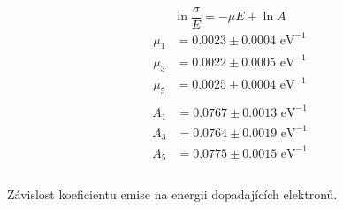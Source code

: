\documentclass[a4paper,11pt]{article}
\begin{document}
\begin{table}[htpb]
    \begin{minipage}[b]{.35\linewidth}
        \centering
        \begin{equation}
            \ln \frac{\sigma}{E} = -\mu E + \ln A
        \end{equation}
        \begin{align*}
            \mu_1 &= 0.0023 \pm 0.0004 \text{ eV}^{-1} \\
            \mu_3 &= 0.0022  \pm 0.0005 \text{ eV}^{-1} \\
            \mu_5 &= 0.0025 \pm 0.0004 \text{ eV}^{-1}\\
        \end{align*}
        \vspace{-30pt}
        \begin{align*}
            A_1 &= 0.0767 \pm 0.0013  \text{ eV}^{-1}\\
            A_3 &= 0.0764 \pm 0.0019 \text{ eV}^{-1}\\
            A_5 &= 0.0775 \pm 0.0015 \text{ eV}^{-1}\\
            \\
        \end{align*}
    \end{minipage} 
    \hfill
    \begin{minipage}[b]{.60\linewidth}
        \centering
        
        \captionsetup{type=graph}
        \caption{Závislost koeficientu emise na energii dopadajících elektronů.}
    \end{minipage} 
\end{table}

\vspace{-10pt}
\end{document}
